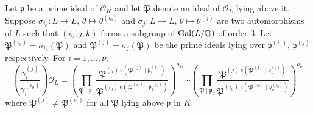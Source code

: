 \begin{lemma}\label{lem:cancellation}
Let $\mathfrak{p}$ be a prime ideal of $\mathcal{O}_K$ and let $\mathfrak{P}$ denote an ideal of $\mathcal{O}_L$ lying above it. Suppose $\sigma_{i_0}: L \to L$, $\theta \mapsto \theta^{(i_0)}$ and $\sigma_{j}: L \to L$, $\theta \mapsto \theta^{(j)}$ are two automorphisms of $L$ such that $(i_0,j,k)$ forms a subgroup of $\operatorname{Gal}(L/\mathbb{Q})$ of order $3$. Let $\mathfrak{P}^{(i_0)} = \sigma_{i_0}(\mathfrak{P})$ and $\mathfrak{P}^{(j)} = \sigma_{j}(\mathfrak{P})$ be the prime ideals lying over $\mathfrak{p}^{(i_0)}$, $\mathfrak{p}^{(j)}$ respectively. For $i = 1, \dots, \nu$, 
\[\left( \frac{\gamma_i^{(j)}}{\gamma_i^{(i_0)}}\right)\mathcal{O}_L 
	 = \left(\prod_{\mathfrak{P}\mid\mathfrak{p}_1} \frac{\mathfrak{P}^{(j) \ e(\mathfrak{P}^{(j)}\mid\mathfrak{p}_1^{(j)})}}{\mathfrak{P}^{(i_0) \ e(\mathfrak{P}^{(i_0)}\mid\mathfrak{p}^{(i_0)}_1)}}\right)^{a_{1i}} \cdots \left(\prod_{\mathfrak{P}\mid\mathfrak{p}_{\nu}} \frac{\mathfrak{P}^{(j) \ e(\mathfrak{P}^{(j)}\mid\mathfrak{p}^{(j)}_{\nu})}}{\mathfrak{P}^{(i_0) \ e(\mathfrak{P}^{(i_0)}\mid\mathfrak{p}^{(i_0)}_{\nu})}}\right)^{a_{\nu i}}\]
where $\mathfrak{P}^{(j)} \neq \mathfrak{P}^{(i_0)}$ for all $\mathfrak{P}$ lying above $\mathfrak{p}$ in $K$. 
\end{lemma}

